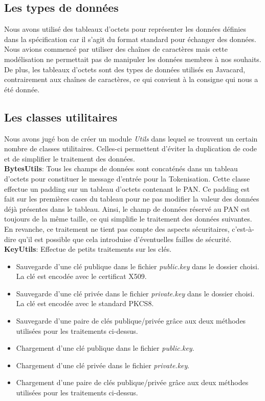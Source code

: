 \documentclass{report}
\begin{document}
\subsection{Les types de données}
Nous avons utilisé des tableaux d'octets pour représenter les données définies dans la spécification car il s'agit du format standard pour échanger des données. Nous avions commencé par utiliser des chaînes de caractères mais cette modélisation ne permettait pas de manipuler les données membres à nos souhaits.\\
De plus, les tableaux d'octets sont des types de données utilisés en Javacard, contrairement aux chaînes de caractères, ce qui convient à la consigne qui nous a été donnée.

\subsection{Les classes utilitaires}
Nous avons jugé bon de créer un module \textit{Utils} dans lequel se trouvent un certain nombre de classes utilitaires. Celles-ci permettent d'éviter la duplication de code et de simplifier le traitement des données.\\

\noindent
\textbf{BytesUtils}: Tous les champs de données sont concaténés dans un tableau d'octets pour constituer le message d'entrée pour la Tokenisation. Cette classe effectue un padding sur un tableau d'octets contenant le PAN. Ce padding est fait sur les premières cases du tableau pour ne pas modifier la valeur des données déjà présentes dans le tableau. Ainsi, le champ de données réservé au PAN est toujours de la même taille, ce qui simplifie le traitement des données suivantes. En revanche, ce traitement ne tient pas compte des aspects sécuritaires, c'est-à-dire qu'il est possible que cela introduise d'éventuelles failles de sécurité.\\

\noindent
\textbf{KeyUtils}: Effectue de petits traitements sur les clés.
\begin{itemize}
	\item Sauvegarde d'une clé publique dans le fichier \textit{public.key} dans le dossier choisi. La clé est encodée avec le certificat X509.
	\item Sauvegarde d'une clé privée dans le fichier \textit{private.key} dans le dossier choisi. La clé est encodée avec le standard PKCS8.
	\item Sauvegarde d'une paire de clés publique/privée grâce aux deux méthodes utilisées pour les traitements ci-dessus.
	\item Chargement d'une clé publique dans le fichier \textit{public.key}.
	\item Chargement d'une clé privée dans le fichier \textit{private.key}.
	\item Chargement d'une paire de clés publique/privée grâce aux deux méthodes utilisées pour les traitements ci-dessus.
\end{itemize}
\end{document}

